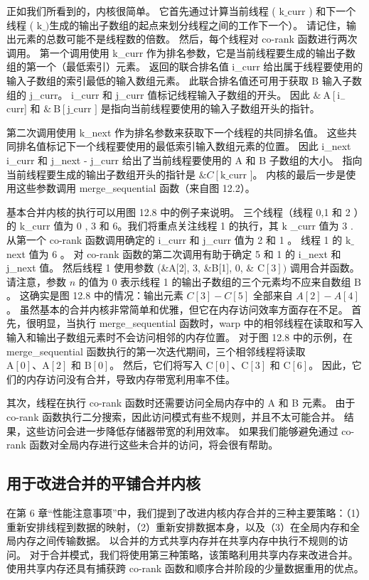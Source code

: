 正如我们所看到的，内核很简单。 它首先通过计算当前线程 ( $\mathrm{k} \_$curr ) 和下一个线程 ( $\mathrm{k} \_ ) 生成的输出子数组的起点来划分线程之间的工作 $下一个）。 请记住，输出元素的总数可能不是线程数的倍数。 然后，每个线程对 co-rank 函数进行两次调用。 第一个调用使用 k\_curr 作为排名参数，它是当前线程要生成的输出子数组的第一个（最低索引）元素。 返回的联合排名值 i\_curr 给出属于线程要使用的输入子数组的索引最低的输入数组元素。 此联合排名值还可用于获取 $\mathrm{B}$ 输入子数组的 j\_curr。 i\_curr 和 j\_curr 值标记线程输入子数组的开头。 因此 $\& \mathrm{~A}\left[\mathrm{i}_{-}\right.$curr] 和 $\& \mathrm{~B}\left[\mathrm{j} \_\right .$curr $]$ 是指向当前线程要使用的输入子数组开头的指针。

第二次调用使用 k\_next 作为排名参数来获取下一个线程的共同排名值。 这些共同排名值标记下一个线程要使用的最低索引输入数组元素的位置。 因此 i\_next i\_curr 和 j\_next - j\_curr 给出了当前线程要使用的 A 和 B 子数组的大小。 指向当前线程要生成的输出子数组开头的指针是 $\& C\left[\mathrm{k} \_\right.$curr $]$。 内核的最后一步是使用这些参数调用 merge\_sequential 函数（来自图 12.2）。

基本合并内核的执行可以用图 12.8 中的例子来说明。 三个线程（线程 0,1 和 2 ）的 k\_curr 值为 0 , 3 和 6。我们将重点关注线程 1 的执行，其 $\mathrm{k}$ \_curr 值为 3 . 从第一个 co-rank 函数调用确定的 i\_curr 和 j\_curr 值为 2 和 1 。 线程 1 的 $\mathrm{k} \_$next 值为 6 。 对 co-rank 函数的第二次调用有助于确定 5 和 1 的 i\_next 和 j\_next 值。 然后线程 1 使用参数 (\&A[2], 3, \&B[1], 0, \& $\mathrm{C}[3])$ 调用合并函数。 请注意，参数 $n$ 的值为 0 表示线程 1 的输出子数组的三个元素均不应来自数组 $\mathrm{B}$。 这确实是图 12.8 中的情况：输出元素 $C[3]-C[5]$ 全部来自 $A[2]-A[4]$。 虽然基本的合并内核非常简单和优雅，但它在内存访问效率方面存在不足。 首先，很明显，当执行 merge\_sequential 函数时，warp 中的相邻线程在读取和写入输入和输出子数组元素时不会访问相邻的内存位置。 对于图 12.8 中的示例，在 merge\_sequential 函数执行的第一次迭代期间，三个相邻线程将读取 $\mathrm{A}[0]、\mathrm{A}[2]$ 和 $\mathrm {B}[0]$。 然后，它们将写入 $\mathrm{C}[0]、\mathrm{C}[3]$ 和 $\mathrm{C}[6]$。 因此，它们的内存访问没有合并，导致内存带宽利用率不佳。

其次，线程在执行 co-rank 函数时还需要访问全局内存中的 A 和 B 元素。 由于 co-rank 函数执行二分搜索，因此访问模式有些不规则，并且不太可能合并。 结果，这些访问会进一步降低存储器带宽的利用效率。 如果我们能够避免通过 co-rank 函数对全局内存进行这些未合并的访问，将会很有帮助。

\subsection{用于改进合并的平铺合并内核}
在第 6 章“性能注意事项”中，我们提到了改进内核内存合并的三种主要策略：（1）重新安排线程到数据的映射，（2）重新安排数据本身，以及（3）在全局内存和全局内存之间传输数据。 以合并的方式共享内存并在共享内存中执行不规则的访问。 对于合并模式，我们将使用第三种策略，该策略利用共享内存来改进合并。 使用共享内存还具有捕获跨 co-rank 函数和顺序合并阶段的少量数据重用的优点。

